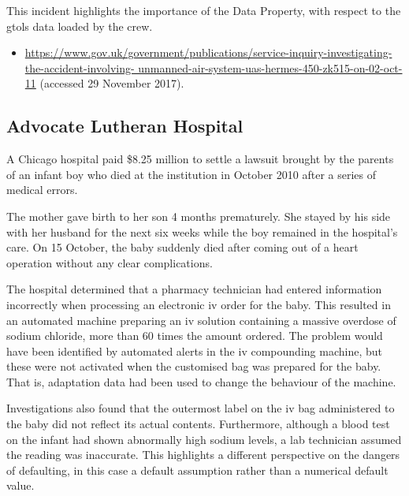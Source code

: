 This incident highlights the importance of the  Data Property, with respect to the \gls{gtols} data loaded by the crew.

\begin{samepage}
\begin{itemize}
	\item \raggedright{\href{https://www.gov.uk/government/publications/service-inquiry-investigating-the-accident-involving-unmanned-air-system-uas-hermes-450-zk515-on-02-oct-11}{https://www.gov.uk/government/publications/service-inquiry-investigating-the-accident-involving- unmanned-air-system-uas-hermes-450-zk515-on-02-oct-11} (accessed 29 November 2017).}
\end{itemize}
\end{samepage}


\subsection{Advocate Lutheran Hospital} \label{bkm:incacc:advocatelutheran}
A Chicago hospital paid \$8.25 million to settle a lawsuit brought by the parents of an infant boy who died at the institution in October 2010 after a series of medical errors.

The mother gave birth to her son 4 months prematurely. She stayed by his side with her husband for the next six weeks while the boy remained in the hospital's care. On 15 October, the baby suddenly died after coming out of a heart operation without any clear complications.

The hospital determined that a pharmacy technician had entered information incorrectly when processing an electronic \gls{iv} order for the baby. This resulted in an automated machine preparing an \gls{iv} solution containing a massive overdose of sodium chloride, more than 60 times the amount ordered. The problem would have been identified by automated alerts in the \gls{iv} compounding machine, but these were not activated when the customised bag was prepared for the baby. That is, \gls{adaptation data} had been used to change the behaviour of the machine.

Investigations also found that the outermost label on the \gls{iv} bag administered to the baby did not reflect its actual contents. Furthermore, although a blood test on the infant had shown abnormally high sodium levels, a lab technician assumed the reading was inaccurate. This highlights a different perspective on the dangers of defaulting, in this case a default assumption rather than a numerical default value.


